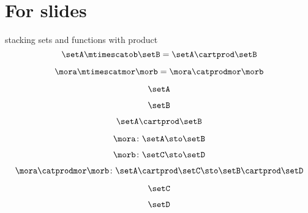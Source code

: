 
\section[For slides]{For slides}

\begin{forslides}

stacking sets and functions with product
    \begin{equation}
        \label{eq:parallelism-000}
        \setA \mtimescatob \setB = \setA \cartprod \setB
    \end{equation}

    \begin{equation}
        \label{eq:parallelism-001}
        \mora \mtimescatmor \morb = \mora \catprodmor \morb
    \end{equation}

    \begin{equation}
        \label{eq:parallelism-002}
        \setA 
    \end{equation}

    \begin{equation}
        \label{eq:parallelism-003}
        \setB 
    \end{equation}

    \begin{equation}
        \label{eq:parallelism-004}
       \setA \cartprod \setB
    \end{equation}

    \begin{equation}
        \label{eq:parallelism-005}
        \mora \colon \setA \sto \setB 
    \end{equation}

    \begin{equation}
        \label{eq:parallelism-006}
        \morb \colon \setC \sto \setD 
    \end{equation}

    \begin{equation}
        \label{eq:parallelism-007}
        \mora \catprodmor \morb \colon \setA \cartprod \setC \sto \setB \cartprod \setD 
    \end{equation}

    \begin{equation}
        \label{eq:parallelism-008}
       \setC
    \end{equation}

    \begin{equation}
        \label{eq:parallelism-009}
         \setD
    \end{equation}


\end{forslides}
